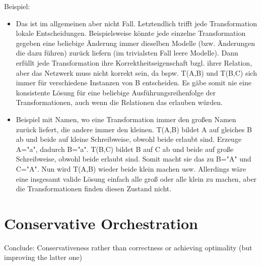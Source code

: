 Beispiel:
\begin{itemize}
    \item Das ist im allgemeinen aber nicht Fall. Letztendlich trifft jede Transformation lokale Entscheidungen. Beispielsweise könnte jede einzelne Transformation gegeben eine beliebige Änderung immer dieselben Modelle (bzw. Änderungen die dazu führen) zurück liefern (im trivialsten Fall leere Modelle). Dann erfüllt jede Transformation ihre Korrektheitseigenschaft bzgl. ihrer Relation, aber das Netzwerk muss nicht korrekt sein, da bspw. T(A,B) und T(B,C) sich immer für verschiedene Instanzen von B entscheiden. Es gäbe somit nie eine konsistente Lösung für eine beliebige Ausführungsreihenfolge der Transformationen, auch wenn die Relationen das erlauben würden.
    \item Beispiel mit Namen, wo eine Transformation immer den großen Namen zurück liefert, die andere immer den kleinen. T(A,B) bildet A auf gleiches B ab und beide auf kleine Schreibweise, obwohl beide erlaubt sind. Erzeuge A="a", dadurch B="a". T(B,C) bildet B auf C ab und beide auf große Schreibweise, obwohl beide erlaubt sind. Somit macht sie das zu B="A" und C="A". Nun wird T(A,B) wieder beide klein machen usw. Allerdings wäre eine insgesamt valide Lösung einfach alle groß oder alle klein zu machen, aber die Transformationen finden diesen Zustand nicht. 
\end{itemize}



\section{Conservative Orchestration}
Conclude: Conservativeness rather than correctness or achieving optimality (but improving the latter one)




